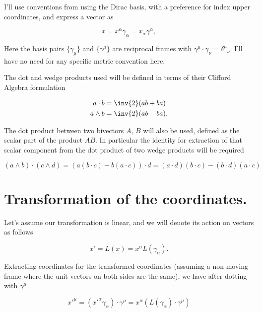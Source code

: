 I'll use conventions from \cite{doran2003gap} using the Dirac basis, with a preference for index upper coordinates, and express a vector as

\begin{equation}\label{eqn:antisymmetricTensorTx:20}
x = x^\alpha \gamma_\alpha = x_\alpha \gamma^\alpha,
\end{equation}

Here the basis pairs $\{\gamma_\mu\}$ and $\{\gamma^\mu\}$ are reciprocal frames with $\gamma^\mu \cdot \gamma_\nu = {\delta^\mu}_\nu$.  I'll have no need for any specific metric convention here.

The dot and wedge products used will be defined in terms of their Clifford Algebra formulation

\begin{align}\label{eqn:antisymmetricTensorTx:25}
a \cdot b &= \inv{2} (a b + b a) \\
a \wedge b &= \inv{2} (a b - b a).
\end{align}

The dot product between two bivectors $A$, $B$ will also be used, defined as the scalar part of the product $AB$.  In particular the identity for extraction of that scalar component from the dot product of two wedge products will be required

\begin{equation}\label{eqn:antisymmetricTensorTx:26}
(a \wedge b ) \cdot (c \wedge d)
= ( a (b \cdot c) - b ( a \cdot c) ) \cdot d
= (a \cdot d) (b \cdot c) - (b \cdot d) ( a \cdot c) 
\end{equation}

\section{Transformation of the coordinates.}

Let's assume our transformation is linear, and we will denote its action on vectors as follows

\begin{equation}\label{eqn:antisymmetricTensorTx:30}
x' = L(x) = x^\alpha L( \gamma_\alpha).
\end{equation}

Extracting coordinates for the transformed coordinates (assuming a non-moving frame where the unit vectors on both sides are the same), we have after dotting with $\gamma^\mu$

\begin{equation}\label{eqn:antisymmetricTensorTx:40}
{x'}^\mu = \left( {x'}^\alpha \gamma_\alpha \right) \cdot \gamma^\mu
= x^\alpha \left( L( \gamma_\alpha) \cdot \gamma^\mu \right) 
\end{equation}

